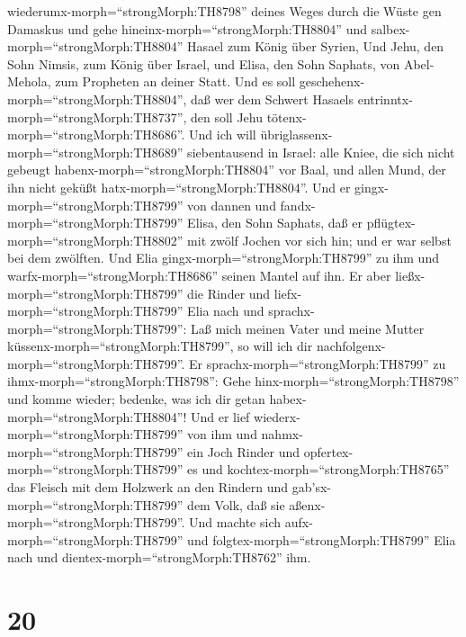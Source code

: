 wiederumx-morph=``strongMorph:TH8798'' deines Weges durch die Wüste gen
Damaskus und gehe hineinx-morph=``strongMorph:TH8804'' und
salbex-morph=``strongMorph:TH8804'' Hasael zum König über Syrien,
 Und Jehu, den Sohn Nimsis, zum König über Israel, und
Elisa, den Sohn Saphats, von Abel-Mehola, zum Propheten an deiner Statt.
 Und es soll geschehenx-morph=``strongMorph:TH8804'', daß
wer dem Schwert Hasaels entrinntx-morph=``strongMorph:TH8737'', den soll
Jehu tötenx-morph=``strongMorph:TH8686''.  Und ich will
übriglassenx-morph=``strongMorph:TH8689'' siebentausend in Israel: alle
Kniee, die sich nicht gebeugt habenx-morph=``strongMorph:TH8804'' vor
Baal, und allen Mund, der ihn nicht geküßt
hatx-morph=``strongMorph:TH8804''.  Und er
gingx-morph=``strongMorph:TH8799'' von dannen und
fandx-morph=``strongMorph:TH8799'' Elisa, den Sohn Saphats, daß er
pflügtex-morph=``strongMorph:TH8802'' mit zwölf Jochen vor sich hin; und
er war selbst bei dem zwölften. Und Elia
gingx-morph=``strongMorph:TH8799'' zu ihm und
warfx-morph=``strongMorph:TH8686'' seinen Mantel auf ihn. 
Er aber ließx-morph=``strongMorph:TH8799'' die Rinder und
liefx-morph=``strongMorph:TH8799'' Elia nach und
sprachx-morph=``strongMorph:TH8799'': Laß mich meinen Vater und meine
Mutter küssenx-morph=``strongMorph:TH8799'', so will ich dir
nachfolgenx-morph=``strongMorph:TH8799''. Er
sprachx-morph=``strongMorph:TH8799'' zu
ihmx-morph=``strongMorph:TH8798'': Gehe
hinx-morph=``strongMorph:TH8798'' und komme wieder; bedenke, was ich dir
getan habex-morph=``strongMorph:TH8804''!  Und er lief
wiederx-morph=``strongMorph:TH8799'' von ihm und
nahmx-morph=``strongMorph:TH8799'' ein Joch Rinder und
opfertex-morph=``strongMorph:TH8799'' es und
kochtex-morph=``strongMorph:TH8765'' das Fleisch mit dem Holzwerk an den
Rindern und gab'sx-morph=``strongMorph:TH8799'' dem Volk, daß sie
aßenx-morph=``strongMorph:TH8799''. Und machte sich
aufx-morph=``strongMorph:TH8799'' und
folgtex-morph=``strongMorph:TH8799'' Elia nach und
dientex-morph=``strongMorph:TH8762'' ihm.

\hypertarget{section-19}{%
\section{20}\label{section-19}}

